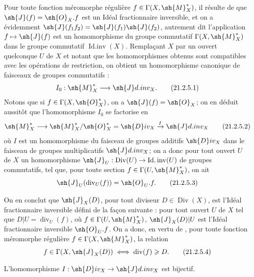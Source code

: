 \begin{env}[21.2.5]
\label{IV.21.2.5}
Pour toute fonction méromorphe régulière $f\in\Gamma(X,\sh{M}_X^*)$, il résulte de  que $\sh{J}(f)=\sh{O}_X.f$ est un Idéal fractionnaire inversible, et on a évidemment $\sh{J}(f_1f_2)=\sh{J}(f_1)\sh{J}(f_2)$, autrement dit l'application $f\mapsto\sh{J}(f)$ est un homomorphisme du groupe commutatif $\Gamma(X,\sh{M}_X^*)$ dans le groupe commutatif $\operatorname{Id.inv}(X)$.
Remplaçant $X$ par un ouvert quelconque $U$ de $X$ et notant que les homomorphismes obtenus sont compatibles avec les opérations de restriction, on obtient un homomorphisme canonique de faisceaux de groupes commutatifs :
\[
\label{IV.21.2.5.1}
  I_0:\sh{M}_X^*\to\sh{J}d.inv_X.
  \tag{21.2.5.1}
\]
Notons que si $f\in\Gamma(X,\sh{O}_X^*)$, on a $\sh{J}(f)=\sh{O}_X$;
on en déduit aussitôt que l'homomorphisme $I_0$ se factorise en
\[
\label{IV.21.2.5.2}
  \sh{M}_X^*\to\sh{M}_X^*/\sh{O}_X^*=\sh{D}iv_X\xrightarrow{I}\sh{J}d.inv_X
  \tag{21.2.5.2}
\]
où $I$ est un homomorphisme du faisceau de groupes additifs $\sh{D}iv_X$ dans le faisceau de groupes multiplicatifs $\sh{J}d.inv_X$;
on a donc pour tout ouvert $U$ de $X$ un homomorphisme $\sh{J}_U:\operatorname{Div}(U)\to\operatorname{Id.inv}(U)$ de groupes commutatifs, tel que, pour toute section $f\in\Gamma(U,\sh{M}_X^*)$, on ait
\[
\label{IV.21.2.5.3}
  \sh{J}_U(\operatorname{div}_U(f))=\sh{O}_U.f.
  \tag{21.2.5.3}
\]


On en conclut que $\sh{J}_X(D)$, pour tout diviseur $D\in\operatorname{Div}(X)$, est l'Idéal fractionnaire inversible défini de la façon suivante : pour tout ouvert $U$ de $X$ tel que $D|U=\operatorname{div}_U(f)$, où $f\in\Gamma(U,\sh{M}_X^*)$, $\sh{J}_X(D)|U$ est l'Idéal fractionnaire inversible $\sh{O}_U.f$.
On a donc, en vertu de , pour toute fonction méromorphe régulière $f\in\Gamma(X,\sh{M}_X^*)$, la relation
\[
\label{IV.21.2.5.4}
  f\in\Gamma(X,\sh{J}_X(D)) \iff \operatorname{div}(f)\geq D.
  \tag{21.2.5.4}
\]
\end{env}

\begin{proposition}[21.2.6]
\label{IV.21.2.6}
L'homomorphisme $I:\sh{D}iv_X\to\sh{J}d.inv_X$ est bijectif.
\end{proposition}

